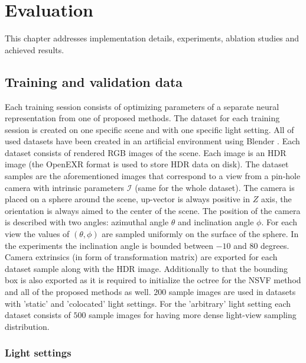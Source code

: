 
\chapter{Evaluation}
\label{chap:evaluation}

This chapter addresses implementation details, experiments, ablation studies and achieved results.



\section{Training and validation data}
\label{sec:datasets}

Each training session consists of optimizing parameters of a separate neural representation from one of proposed methods.
The dataset for each training session is created on one specific scene and with one specific light setting.
All of used datasets have been created in an artificial environment using Blender \cite{blender}.
Each dataset consists of rendered RGB images of the scene.
Each image is an HDR image (the OpenEXR \cite{openexr} format is used to store HDR data on disk).
The dataset samples are the aforementioned images
that correspond to a view from a pin-hole camera with intrinsic parameters $\mathcal{I}$ (same for the whole dataset).
The camera is placed on a sphere around the scene,
up-vector is always positive in $Z$ axis,
the orientation is always aimed to the center of the scene.
The position of the camera is described with two angles: azimuthal angle $\theta$ and inclination angle $\phi$.
For each view the values of $(\theta, \phi)$ are sampled uniformly on the surface of the sphere.
In the experiments the inclination angle is bounded between $-10$ and $80$ degrees.
Camera extrinsics (in form of transformation matrix) are exported for each dataset sample along with the HDR image.
Additionally to that the bounding box is also exported as it is required
to initialize the octree for the NSVF method and all of the proposed methods as well.
$200$ sample images are used in datasets with 'static' and 'colocated' light settings.
For the 'arbitrary' light setting each dataset consists of $500$ sample images
for having more dense light-view sampling distribution.


\subsection{Light settings}

